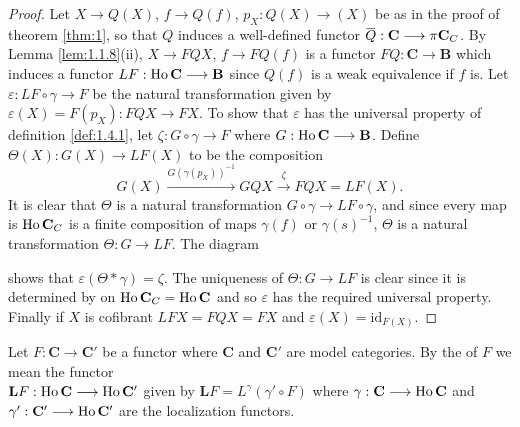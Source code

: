 \documentclass[../main]{subfiles}
\begin{document}
\begin{proof}
    Let $X \longrightarrow  Q(X)$, $f\longrightarrow  Q(f)$, $p_X:Q(X)\longrightarrow (X)$ be as in the proof of theorem \ref{thm:1}, so that $Q$ induces a well-defined functor $\xoverline{Q}:\mathbf{C} \longrightarrow  \pi \mathbf{C}_C$. By Lemma \ref{lem:1.1.8}(ii), $X\longrightarrow  FQX$, $f\longrightarrow  FQ(f)$ is a functor $FQ:\mathbf{C}\longrightarrow  \mathbf{B}$ which induces a functor $LF:\operatorname{Ho} \mathbf{C}\longrightarrow  \mathbf{B}$ since $Q(f)$ is a weak equivalence if $f$ is. Let $\varepsilon: LF\circ \gamma \longrightarrow  F$ be the natural transformation given by \\$\varepsilon(X) = F(p_X):FQX\longrightarrow  FX$. To show that $\varepsilon$ has the universal property of definition \ref{def:1.4.1}, let $\zeta:G\circ \gamma \longrightarrow  F$ where $G:\operatorname{Ho} \mathbf{C} \longrightarrow  \mathbf{B}$. Define \\$\Theta(X):G(X)\longrightarrow  LF(X)$ to be the composition
    \[G(X)\xrightarrow{G(\gamma(p_X))^{-1}} GQX \xrightarrow{\zeta} FQX = LF(X).\]
    It is clear that $\Theta$ is a natural transformation $G\circ \gamma \longrightarrow  LF\circ \gamma$, and since every map is $\operatorname{Ho} \mathbf{C}_C$ is a finite composition of maps $\gamma(f)$ or $\gamma(s)^{-1}$, $\Theta$ is a natural transformation $\Theta: G\longrightarrow  LF$. The diagram
    \begin{center}
    \end{center}
    shows that $\varepsilon(\Theta \ast \gamma) = \zeta$. The uniqueness of $\Theta: G\longrightarrow  LF$ is clear since it is determined by %
    on $\operatorname{Ho} \mathbf{C}_C = \operatorname{Ho} \mathbf{C}$ and so $\varepsilon$ has the required universal property. Finally if $X$ is cofibrant $LFX=FQX=FX$ and $\varepsilon(X)=\text{id}_{F(X)}$.
\end{proof}
\begin{definition}
    Let $F:\mathbf{C} \longrightarrow  \mathbf{C}'$ be a functor where $\mathbf{C}$ and $\mathbf{C}'$ are model categories. By the  of $F$ we mean the functor\\ $\mathbf{L}F:\operatorname{Ho} \mathbf{C}\longrightarrow \operatorname{Ho}\mathbf{C}'$ given by $\mathbf{L}F= L^\gamma(\gamma'\circ F)$ where $\gamma:\mathbf{C}\longrightarrow\operatorname{Ho} \mathbf{C}$ and $\gamma':\mathbf{C}'\longrightarrow \operatorname{Ho}\mathbf{C}'$ are the localization functors.
\end{definition}
\end{document}
